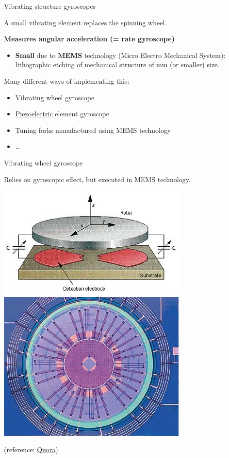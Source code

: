 \documentclass[compress]{beamer}
\begin{document}
\begin{frame}{Vibrating structure gyroscopes}

    A small vibrating element replaces the spinning wheel.

    {\bf Measures angular acceleration (= rate gyroscope)}

    \begin{itemize}

        \item {\bf Small} due to {\bf MEMS} technology (Micro Electro
            Mechanical System): lithographic etching of mechanical structure of
            mm (or smaller) size.

    \end{itemize}

    Many different ways of implementing this:

    \begin{itemize}

        \item Vibrating wheel gyroscope
        \item \href{http://en.wikipedia.org/wiki/Piezoelectric_effect}{Piezoelectric} element gyroscope
        \item Tuning forks manufactured using MEMS technology
        \item \ldots{}
    \end{itemize}

\end{frame}

\begin{frame}{Vibrating wheel gyroscope}

  Relies on gyroscopic effect, but executed in MEMS technology.

    \begin{center}
        \includegraphics[width=0.4\linewidth]{vibratingwheel}
        \includegraphics[width=0.4\linewidth]{vibratingwheel2}
    \end{center}


(reference: \href{https://www.quora.com/How-does-a-MEMS-gyroscope-work}{Quora})

\end{frame}
\end{document}
